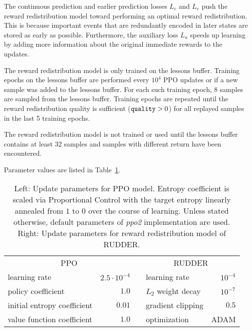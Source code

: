 \documentclass{article}
\begin{document}
\begin{appendices}
The continuous prediction and earlier prediction losses $L_c$ and $L_e$
push the reward redistribution model toward performing an optimal reward redistribution.
This is because important events that are redundantly encoded 
in later states are stored as early as possible.
Furthermore, the auxiliary loss $L_a$ speeds up learning 
by adding more information about the original immediate rewards to the updates.

The reward redistribution model is only trained on the lessons buffer.
Training epochs on the lessons buffer are performed every $10^4$ PPO updates or if a new sample was added to the lessons buffer.
For each such training epoch, 8 samples are sampled from the lessons buffer.
Training epochs are repeated until the reward redistribution quality 
is sufficient ($\text{\tt quality} > 0$) for all replayed samples in the last 5 training epochs.

The reward redistribution model is not trained or used until
the lessons buffer contains at least 32 samples
and samples with different return have been encountered.

Parameter values are listed in Table~\ref{tab:atari_params}.


\begin{table}[htp]
\begin{center}
\begin{tabular}{lrclr}
\toprule
\multicolumn{2}{c}{PPO} & & \multicolumn{2}{c}{RUDDER}\\
learning rate & $2.5 \cdot 10^{-4}$ & & learning rate & $10^{-4}$ \\
policy coefficient & $1.0$ & & $L_2$ weight decay  & $10^{-7}$ \\
initial entropy coefficient & $0.01$ & & gradient clipping  & $0.5$ \\
value function coefficient & $1.0$ & & optimization & ADAM \\
\bottomrule
\end{tabular}
\end{center}
\caption{Left: Update parameters for PPO model.
Entropy coefficient is scaled via Proportional Control 
with the target entropy linearly annealed from $1$ to $0$ over the course of learning.
Unless stated otherwise,
default parameters of {\em ppo2} implementation \cite{Dhariwal:17} are used.
Right: Update parameters for reward redistribution model of RUDDER.
\label{tab:atari_params}}\end{table}



\end{appendices}
\end{document}
